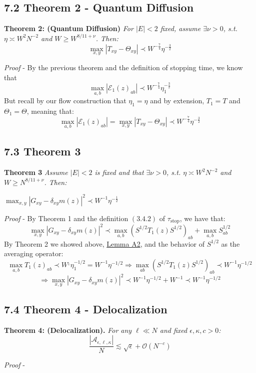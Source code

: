 \documentclass[11pt]{article}
\newenvironment{boxtheorem}[1]
  {\begin{mdframed}\noindent\textbf{#1}\itshape\space}
  {\end{mdframed}}
\newcommand{\E}{\mathcal{E}}
\newcommand{\sto}{\text{stop}}
\begin{document}
\subsection*{7.2 Theorem 2 - Quantum Diffusion}
\begin{boxtheorem}{Theorem 2: (Quantum Diffusion)}
For $|E|<2$ fixed, assume $\exists \nu>0$, s.t. $\eta \asymp W^2 N^{-2}$ and $W\geq W^{8/11+\nu}$. Then: $$\max_{x, y}|T_{xy}-\Theta_{xy}|\prec W^{-\frac{7}{4}}\eta^{-\frac{3}{2}}$$
\end{boxtheorem}
\textit{Proof} - By the previous theorem and the definition of stopping time, we know that $$\max_{a,b}|\E_1(z)_{ab}|\prec W^{-\frac{7}{4}} \eta_1^{-\frac{3}{2}}$$
But recall by our flow construction that $\eta_1=\eta$ and by extension, $T_1=T$ and $\Theta_1=\Theta$, meaning that: $$\max_{a,b}|\E_1(z)_{ab}| =\max_{x, y}|T_{xy}-\Theta_{xy}|\prec W^{-\frac{7}{4}}\eta^{-\frac{3}{2}}$$

\subsection*{7.3 Theorem 3}
\label{proof-deloc}
\begin{boxtheorem}{Theorem 3}
\noindent Assume $|E|<2$ is fixed and that $\exists \nu>0$, s.t. $\eta \asymp W^2 N^{-2}$ and $W\geq N^{8/11+\nu}$. Then:
\begin{center}$\max_{x, y}|G_{xy} - \delta_{xy}m(z)|^2\prec W^{-1}\eta^{-\frac{1}{2}}$\end{center}
\end{boxtheorem}
\textit{Proof} - By Theorem 1 and the definition $(3.4.2)$ of $\tau_\sto$, we have that: $$\max_{x, y}|G_{xy} - \delta_{xy}m(z)|^2\prec \max_{a, b}(S^{1/2}T_1(z)S^{1/2})_{ab}+\max_{a, b}S_{ab}^{1/2}$$
By Theorem 2 we showed above, \hyperref[lemma-a2]{Lemma A2}, and the behavior of $S^{1/2}$ as the averaging operator: $$\max_{a, b}T_1(z)_{ab}\prec W^{_1}\eta_1^{-1/2} = W^{-1}\eta^{-1/2}\Rightarrow \max_{ab}\left(S^{1/2}T_1(z)S^{1/2}\right)_{ab}\prec W^{-1}\eta^{-1/2}$$
$$\Rightarrow \max_{x, y}|G_{xy} - \delta_{xy}m(z)|^2\prec  W^{-1}\eta^{-1/2}+W^{-1}\prec  W^{-1}\eta^{-1/2}$$
\subsection*{7.4 Theorem 4 - Delocalization}
\begin{boxtheorem}{Theorem 4: (Delocalization).}
For any $\ell\ll N$ and fixed $\epsilon, \kappa, c>0$: $$\frac{|\mathcal{A}_{\epsilon, \ell, \kappa}|}{N}\lesssim \sqrt{\epsilon}+\mathcal{O}(N^{-c})$$
\end{boxtheorem}
\textit{Proof} - 
\end{document}
